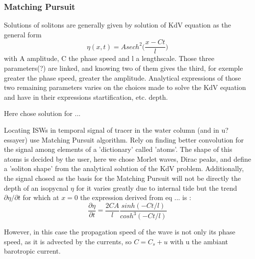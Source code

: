 \subsubsection{Matching Pursuit}



Solutions of solitons are generally given by solution of KdV equation as the general form 
\begin{equation}
\eta(x,t) = A sech^2\bigg( \frac{x-Ct}{l} \bigg) 
\end{equation}
with A amplitude, C the phase speed and l a lengthscale. Those three parameters(?) are linked, and knowing two of them gives the third, for exemple greater the phase speed, greater the amplitude. Analytical expressions of those two remaining parameters varies on the choices made to solve the KdV equation and have in their expressions startification, etc. depth. 

Here chose solution for ... 


Locating ISWs in temporal signal of tracer in the water column (and in u? essayer) use Matching Pursuit algorithm. Rely on finding better convolution for the signal among elements of a 'dictionary' called 'atoms'. The shape of this atoms is decided by the user, here we chose Morlet waves, Dirac peaks, and define a 'soliton shape' from the analytical solution of the KdV problem. Additionally, the signal chosed as the basis for the Matching Pursuit will not be directly the depth of an isopycnal $\eta$ for it varies greatly due to internal tide but the trend $\partial \eta/\partial t$ for which at $x=0$ the expression derived from eq ... is :
\begin{equation}
\frac{\partial \eta}{\partial t} = \frac{2 C A}{l} \frac{sinh(-Ct/l)}{cosh^3(-Ct/l)}
\end{equation}

However, in this case the propagation speed of the wave is not only its phase speed, as it is advected by the currents, so $C=C_s+u$ with u the ambiant barotropic current.


